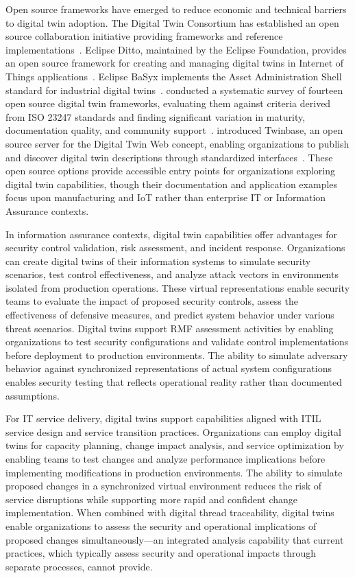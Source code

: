 Open source frameworks have emerged to reduce economic and technical barriers to digital twin adoption. The Digital Twin Consortium has established an open source collaboration initiative providing frameworks and reference implementations~\parencite{DTC_OpenSource_2024}. Eclipse Ditto, maintained by the Eclipse Foundation, provides an open source framework for creating and managing digital twins in Internet of Things applications~\parencite{Eclipse_Ditto_2024}. Eclipse BaSyx implements the Asset Administration Shell standard for industrial digital twins~\parencite{Eclipse_BaSyx_2024}. \citeauthor{Gil_2024} conducted a systematic survey of fourteen open source digital twin frameworks, evaluating them against criteria derived from ISO 23247 standards and finding significant variation in maturity, documentation quality, and community support~\parencite{Gil_2024}. \citeauthor{Autiosalo_Siegel_Tammi_2021} introduced Twinbase, an open source server for the Digital Twin Web concept, enabling organizations to publish and discover digital twin descriptions through standardized interfaces~\parencite{Autiosalo_Siegel_Tammi_2021}. These open source options provide accessible entry points for organizations exploring digital twin capabilities, though their documentation and application examples focus upon manufacturing and IoT rather than enterprise IT or Information Assurance contexts.

In information assurance contexts, digital twin capabilities offer advantages for security control validation, risk assessment, and incident response. Organizations can create digital twins of their information systems to simulate security scenarios, test control effectiveness, and analyze attack vectors in environments isolated from production operations. These virtual representations enable security teams to evaluate the impact of proposed security controls, assess the effectiveness of defensive measures, and predict system behavior under various threat scenarios. Digital twins support RMF assessment activities by enabling organizations to test security configurations and validate control implementations before deployment to production environments. The ability to simulate adversary behavior against synchronized representations of actual system configurations enables security testing that reflects operational reality rather than documented assumptions.

For IT service delivery, digital twins support capabilities aligned with ITIL service design and service transition practices. Organizations can employ digital twins for capacity planning, change impact analysis, and service optimization by enabling teams to test changes and analyze performance implications before implementing modifications in production environments. The ability to simulate proposed changes in a synchronized virtual environment reduces the risk of service disruptions while supporting more rapid and confident change implementation. When combined with digital thread traceability, digital twins enable organizations to assess the security and operational implications of proposed changes simultaneously---an integrated analysis capability that current practices, which typically assess security and operational impacts through separate processes, cannot provide.

